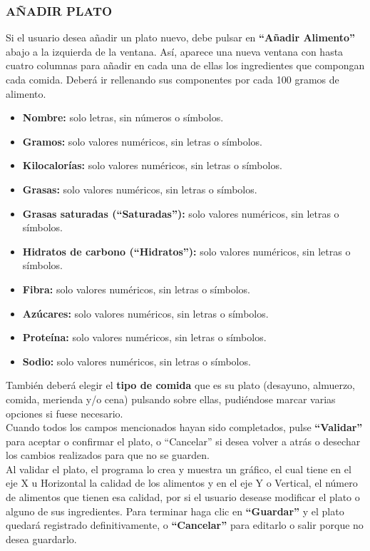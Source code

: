 \subsubsection{AÑADIR PLATO}
Si el usuario desea añadir un plato nuevo, debe pulsar en \textbf{“Añadir Alimento”} abajo a la izquierda de la ventana. Así, aparece una nueva ventana con hasta cuatro columnas para añadir en cada una de ellas los ingredientes que compongan cada comida. Deberá ir rellenando sus componentes por cada 100 gramos de alimento.
\begin{itemize}
\item	\textbf{Nombre:} solo letras, sin números o símbolos.
\item	\textbf{Gramos:} solo valores numéricos, sin letras o símbolos.
\item	\textbf{Kilocalorías:} solo valores numéricos, sin letras o símbolos.
\item	\textbf{Grasas:} solo valores numéricos, sin letras o símbolos.
\item	\textbf{Grasas saturadas (“Saturadas”):} solo valores numéricos, sin letras o símbolos.
\item	\textbf{Hidratos de carbono (“Hidratos”):} solo valores numéricos, sin letras o símbolos.
\item	\textbf{Fibra:} solo valores numéricos, sin letras o símbolos.
\item	\textbf{Azúcares:} solo valores numéricos, sin letras o símbolos.
\item	\textbf{Proteína:} solo valores numéricos, sin letras o símbolos.
\item	\textbf{Sodio:} solo valores numéricos, sin letras o símbolos.
\end{itemize}
También deberá elegir el \textbf{tipo de comida} que es su plato (desayuno, almuerzo, comida, merienda y/o cena) pulsando sobre ellas, pudiéndose marcar varias opciones si fuese necesario.\\
Cuando todos los campos mencionados hayan sido completados, pulse \textbf{“Validar”} para aceptar o confirmar el plato, o “Cancelar” si desea volver a atrás o desechar los cambios realizados para que no se guarden.\\
Al validar el plato, el programa lo crea y muestra un gráfico, el cual tiene en el eje X u Horizontal la calidad de los alimentos y en el eje Y o Vertical, el número de alimentos que tienen esa calidad, por si el usuario desease modificar el plato o alguno de sus ingredientes. Para terminar haga clic en \textbf{“Guardar”} y el plato quedará registrado definitivamente, o \textbf{“Cancelar”} para editarlo o salir porque no desea guardarlo.\\


